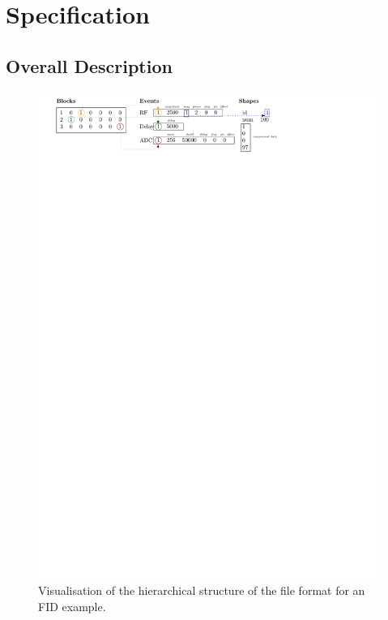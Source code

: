 \documentclass{article}
\begin{document}
\section{Specification}\label{sec:specification}

\subsection{Overall Description}

\begin{figure}[H]
\includegraphics[width=\columnwidth]{block_diagram}
\caption{Visualisation of the hierarchical structure of the file format for an FID example.\label{fig:block_diagram}}
\end{figure}
\end{document}
